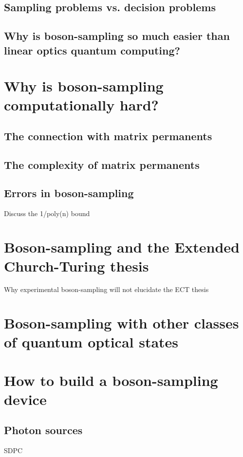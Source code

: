 \documentclass[aps,pra,twocolumn,amsmath,amssymb,nofootinbib,superscriptaddress]{revtex4}
\begin{document}
\subsection{Sampling problems vs. decision problems}

\subsection{Why is boson-sampling so much easier than linear optics quantum computing?}

\section{Why is boson-sampling computationally hard?}

\subsection{The connection with matrix permanents}

\subsection{The complexity of matrix permanents}

\subsection{Errors in boson-sampling}
Discuss the 1/poly(n) bound

\section{Boson-sampling and the Extended Church-Turing thesis}
Why experimental boson-sampling will not elucidate the ECT thesis

\section{Boson-sampling with other classes of quantum optical states}

\section{How to build a boson-sampling device}

\subsection{Photon sources}
SDPC
\end{document}
